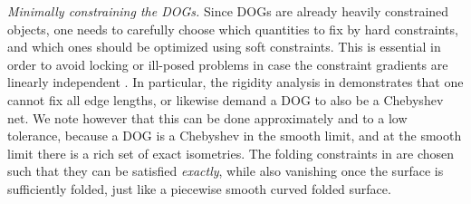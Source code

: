 \emph{Minimally constraining the DOGs.} Since DOGs are already heavily constrained objects, one needs to carefully choose which quantities to fix by hard constraints, and which ones should be optimized using soft constraints. This is essential in order to avoid locking or ill-posed problems in case the constraint gradients are linearly independent \cite{rabi2018shape}. In particular, the rigidity analysis in \cite{rabi18} demonstrates that one cannot fix all edge lengths, or likewise demand a DOG to also be a Chebyshev net. We note however that this can be done approximately and to a low tolerance, because a DOG is a Chebyshev in the smooth limit, and at the smooth limit there is a rich set of exact isometries. The folding constraints in  are chosen such that they can be satisfied \emph{exactly}, while also vanishing  once the surface is sufficiently folded, just like a piecewise smooth curved folded surface. 
